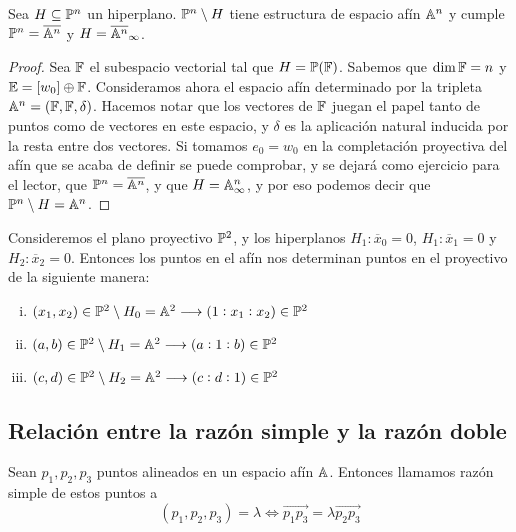  \begin{prop}
   Sea $H \subseteq \mathbb{P}^n$ un hiperplano. $\mathbb{P}^n \setminus H$ tiene estructura de
   espacio afín $\mathbb{A}^n$ y cumple $\mathbb{P}^n = \overline{\mathbb{A}^n}$ y $H = \overline{\mathbb{A}^n}_\infty$.
 \end{prop}

 \begin{proof}
  Sea $\mathbb{F}$ el subespacio vectorial tal que $H = \mathbb{P}(\mathbb{F})$. Sabemos que $\dim \mathbb{F} = n$ y
  $\mathbb{E} = [w_0] \oplus \mathbb{F}$. Consideramos ahora el espacio afín determinado por la tripleta
  $\mathbb{A}^n = (\mathbb{F}, \mathbb{F}, \delta)$. Hacemos notar que los vectores de $\mathbb{F}$ juegan el papel 
  tanto de puntos como de vectores
  en este espacio, y $\delta$ es la aplicación natural inducida por la resta entre dos
  vectores. Si tomamos $e_0 = w_0$ en la completación proyectiva
  del afín que se acaba de definir se puede comprobar, y se dejará como ejercicio para
  el lector, que $\mathbb{P}^n = \overline{\mathbb{A}^n}$, y que $H = \mathbb{A}^n_\infty$, y por eso podemos
  decir que $\mathbb{P}^n \setminus H = \mathbb{A}^n$.
 \end{proof}

\begin{example}
  Consideremos el plano proyectivo $\mathbb{P}^2$, y los hiperplanos $H_1\colon \overline{x}_0 = 0$,
  $H_1 \colon \overline{x}_1 = 0$ y $H_2 \colon \overline{x}_2 = 0$. Entonces los puntos
  en el afín nos determinan puntos en el proyectivo de la siguiente manera:
  \begin{enumerate}[i)]
    \item $(x_1, x_2) \in \mathbb{P}^2 \setminus H_0 = \mathbb{A}^2 \longrightarrow (1:x_1:x_2) \in \mathbb{P}^2$
    \item $(a, b) \in \mathbb{P}^2 \setminus H_1 = \mathbb{A}^2 \longrightarrow (a:1:b) \in \mathbb{P}^2$
    \item $(c, d) \in \mathbb{P}^2 \setminus H_2 = \mathbb{A}^2 \longrightarrow (c:d:1) \in \mathbb{P}^2$
  \end{enumerate}
\end{example}

\subsection{Relación entre la razón simple y la razón doble}

\begin{defi}
Sean $p_1, p_2, p_3$ puntos alineados en un espacio afín $\mathbb{A}$. Entonces llamamos razón
simple de estos puntos a
\[(p_1, p_2, p_3) = \lambda \iff \overrightarrow{p_1p_3} = \lambda \overrightarrow{p_2p_3}\]
\end{defi}

